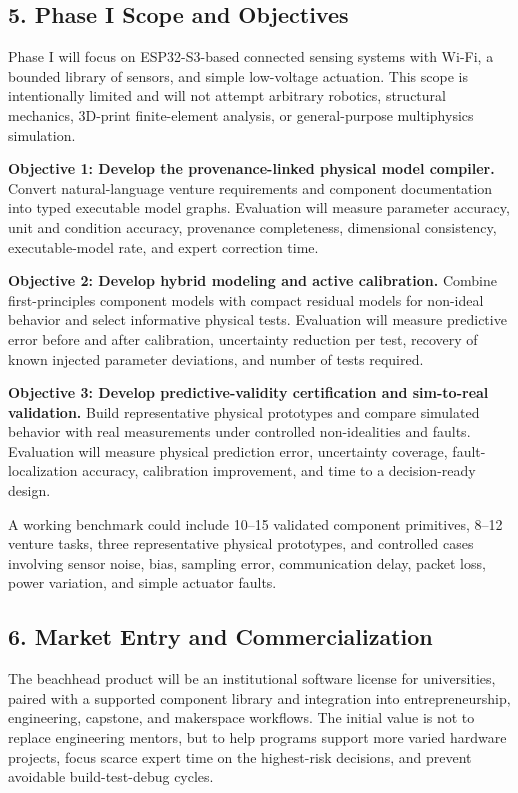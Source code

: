 \documentclass[12pt,letterpaper]{article}
\begin{document}
\subsection*{5. Phase I Scope and Objectives}

Phase I will focus on ESP32-S3-based connected sensing systems with Wi-Fi, a bounded library of sensors, and simple low-voltage actuation. This scope is intentionally limited and will not attempt arbitrary robotics, structural mechanics, 3D-print finite-element analysis, or general-purpose multiphysics simulation.

\textbf{Objective 1: Develop the provenance-linked physical model compiler.} Convert natural-language venture requirements and component documentation into typed executable model graphs. Evaluation will measure parameter accuracy, unit and condition accuracy, provenance completeness, dimensional consistency, executable-model rate, and expert correction time.

\textbf{Objective 2: Develop hybrid modeling and active calibration.} Combine first-principles component models with compact residual models for non-ideal behavior and select informative physical tests. Evaluation will measure predictive error before and after calibration, uncertainty reduction per test, recovery of known injected parameter deviations, and number of tests required.

\textbf{Objective 3: Develop predictive-validity certification and sim-to-real validation.} Build representative physical prototypes and compare simulated behavior with real measurements under controlled non-idealities and faults. Evaluation will measure physical prediction error, uncertainty coverage, fault-localization accuracy, calibration improvement, and time to a decision-ready design.

A working benchmark could include 10--15 validated component primitives, 8--12 venture tasks, three representative physical prototypes, and controlled cases involving sensor noise, bias, sampling error, communication delay, packet loss, power variation, and simple actuator faults.

\subsection*{6. Market Entry and Commercialization}

The beachhead product will be an institutional software license for universities, paired with a supported component library and integration into entrepreneurship, engineering, capstone, and makerspace workflows. The initial value is not to replace engineering mentors, but to help programs support more varied hardware projects, focus scarce expert time on the highest-risk decisions, and prevent avoidable build-test-debug cycles.
\end{document}

